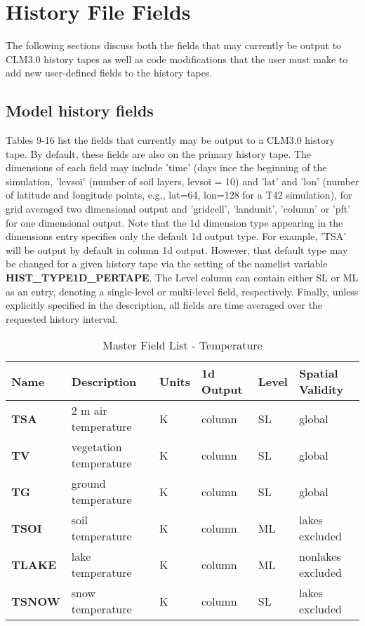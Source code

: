 \section {History File Fields}
\label{sec_history_file}
The following sections discuss both the fields that may currently be
output to CLM3.0 history tapes as well as code modifications that the
user must make to add new user-defined fields to the history tapes.

\subsection {Model history fields}
Tables 9-16 list the fields that currently may be output to a CLM3.0
history tape. By default, these fields are also on the primary history
tape.  The dimensions of each field may include 'time' (days ince the
beginning of the simulation, 'levsoi' (number of soil layers, levsoi =
10) and 'lat' and 'lon' (number of latitude and longitude points,
e.g., lat=64, lon=128 for a T42 simulation), for grid averaged two
dimensional output and 'gridcell', 'landunit', 'column' or 'pft' for
one dimensional output.  Note that the 1d dimension type appearing in
the dimensions entry specifies only the default 1d output type. For
example, 'TSA' will be output by default in column 1d output. However,
that default type may be changed for a given history tape via the
setting of the namelist variable {\bf HIST\_TYPE1D\_PERTAPE}. The
Level column can contain either SL or ML as an entry, denoting a
single-level or multi-level field, respectively. Finally, unless
explicitly specified in the description, all fields are time averaged
over the requested history interval.

\begin{longtable}{|l|p{2.3in}|l|l|l|p{1.0in}|} 
\caption{\label{table_master_field_list} Master Field List - Temperature} \\
\hline
\endhead
\hline
Name & Description & Units & 1d Output & Level & Spatial Validity  \\ 
\hline	\hline	

{\bf TSA} 
& 2 m air temperature 
& K       
& column  
& SL 
& global  \\
\hline	

{\bf TV} 
& vegetation temperature 
& K       
& column  
& SL 
& global \\
\hline	

{\bf TG}
& ground temperature
& K        
& column
& SL 
& global \\
\hline	

{\bf TSOI}
& soil temperature 
& K       
& column  
& ML 
& lakes excluded \\  
\hline	

{\bf TLAKE} 
& lake temperature
& K        
& column
& ML 
& nonlakes excluded \\
\hline	

{\bf TSNOW}
& snow temperature 
& K         
& column
& SL 
& lakes excluded \\ 
\hline	

\end{longtable}

